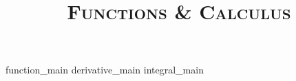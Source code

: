 \documentclass{article}
\title{\textsc{Functions \& Calculus}}
\begin{document}
\maketitle
\tableofcontents

\pagebreak

{function_main}
{derivative_main}
{integral_main}
\end{document}
